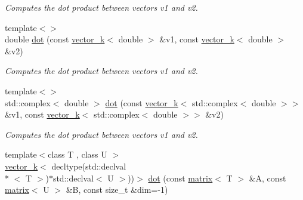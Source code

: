 \begin{DoxyCompactItemize}
\begin{DoxyCompactList}\small\item\em Computes the dot product between vectors v1 and v2. \end{DoxyCompactList}\item 
\hypertarget{namespacekeycpp_a3b8c1401db056696103c4ad8f1aa48ce}{{\footnotesize template$<$$>$ }\\double \hyperlink{namespacekeycpp_a3b8c1401db056696103c4ad8f1aa48ce}{dot} (const \hyperlink{classkeycpp_1_1vector__k}{vector\-\_\-k}$<$ double $>$ \&v1, const \hyperlink{classkeycpp_1_1vector__k}{vector\-\_\-k}$<$ double $>$ \&v2)}\label{namespacekeycpp_a3b8c1401db056696103c4ad8f1aa48ce}

\begin{DoxyCompactList}\small\item\em Computes the dot product between vectors v1 and v2. \end{DoxyCompactList}\item 
\hypertarget{namespacekeycpp_a3499b51e89dfda97b0dcf5dc2461926a}{{\footnotesize template$<$$>$ }\\std\-::complex$<$ double $>$ \hyperlink{namespacekeycpp_a3499b51e89dfda97b0dcf5dc2461926a}{dot} (const \hyperlink{classkeycpp_1_1vector__k}{vector\-\_\-k}$<$ std\-::complex$<$ double $>$$>$ \&v1, const \hyperlink{classkeycpp_1_1vector__k}{vector\-\_\-k}$<$ std\-::complex$<$ double $>$$>$ \&v2)}\label{namespacekeycpp_a3499b51e89dfda97b0dcf5dc2461926a}

\begin{DoxyCompactList}\small\item\em Computes the dot product between vectors v1 and v2. \end{DoxyCompactList}\item 
\hypertarget{namespacekeycpp_a0d4eac6fbefd72947d7fe26fada6c221}{{\footnotesize template$<$class T , class U $>$ }\\\hyperlink{classkeycpp_1_1vector__k}{vector\-\_\-k}$<$ decltype(std\-::declval\\*
$<$ T $>$)$\ast$std\-::declval$<$ U $>$))$>$ \hyperlink{namespacekeycpp_a0d4eac6fbefd72947d7fe26fada6c221}{dot} (const \hyperlink{classkeycpp_1_1matrix}{matrix}$<$ T $>$ \&A, const \hyperlink{classkeycpp_1_1matrix}{matrix}$<$ U $>$ \&B, const size\-\_\-t \&dim=-\/1)}\label{namespacekeycpp_a0d4eac6fbefd72947d7fe26fada6c221}


\end{DoxyCompactItemize}
